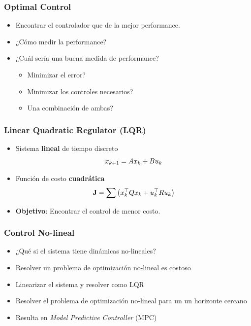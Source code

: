 \begin{frame}
    \frametitle{Optimal Control}
    
    \begin{itemize}
        \item Encontrar el controlador que de la mejor performance.
        \item ¿Cómo medir la performance?
        \item ¿Cuál sería una buena medida de performance?
        \begin{itemize}
            \item Minimizar el error?
            \item Minimizar los controles necesarios?
            \item Una combinación de ambas?
        \end{itemize}
    \end{itemize}
    
\end{frame}

\begin{frame}
    \frametitle{Linear Quadratic Regulator (LQR)}
    
    \begin{itemize}
        \item Sistema \textbf{lineal} de tiempo discreto
        \begin{equation*}
            x_{k+1} = A x_{k} + B u_{k}
        \end{equation*}
        \item Función de costo \textbf{cuadrática}
        \begin{equation*}
            \boldsymbol{\mathbf{J}} = \sum{\left(x_{k}^{\top} Q x_{k} + u_{k}^{\top} R u_{k}\right)}
        \end{equation*}
        \item \textbf{Objetivo}: Encontrar el control de menor costo.
    \end{itemize}
    
\end{frame}

\begin{frame}
    \frametitle{Control No-lineal}
    
    \begin{itemize}
        \item ¿Qué si el sistema tiene dinámicas no-lineales?
        \item Resolver un problema de optimización no-lineal es costoso
        \item Linearizar el sistema y resolver como LQR
        \item Resolver el problema de optimización no-lineal para un un horizonte cercano
        \item Resulta en \emph{Model Predictive Controller} (MPC)
    \end{itemize}
    
\end{frame}

